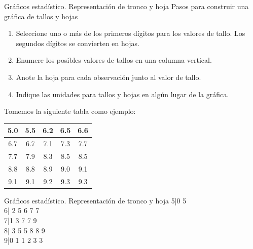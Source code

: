 \documentclass[11pt]{beamer}
\begin{document}
      \begin{frame}{Gráficos estadístico. Representación de tronco y hoja}
          Pasos para construir una gráfica de tallos y hojas
          \begin{enumerate}
              \item Seleccione uno o más de los primeros dígitos para los valores de tallo. Los segundos dígitos se convierten en hojas.
              \item Enumere los posibles valores de tallos en una columna vertical.
              \item Anote la hoja para cada observación junto al valor de tallo.
              \item Indique las unidades para tallos y hojas en algún lugar de la gráfica.
          \end{enumerate}

          Tomemos la siguiente tabla como ejemplo:
          \begin{table}[!h]
              \centering
              \begin{tabular}{|c|c|c|c|c|}
                  \hline
                  5.0 & 5.5 & 6.2 & 6.5 & 6.6 \\
                  \hline
                  6.7 & 6.7 & 7.1 & 7.3 & 7.7 \\
                  \hline
                  7.7 & 7.9 & 8.3 & 8.5 & 8.5 \\
                  \hline
                  8.8 & 8.8 & 8.9 & 9.0 & 9.1 \\
                  \hline
                  9.1 & 9.1 & 9.2 & 9.3 & 9.3 \\
                  \hline
              \end{tabular}
          \end{table}
      \end{frame}

      \begin{frame}{Gráficos estadístico. Representación de tronco y hoja}
        5|0 5\\
        6| 2 5 6 7 7\\
        7|1 3 7 7 9\\
        8| 3 5 5 8 8 9\\
        9|0 1 1 2 3 3\\
      \end{frame}
\end{document}
